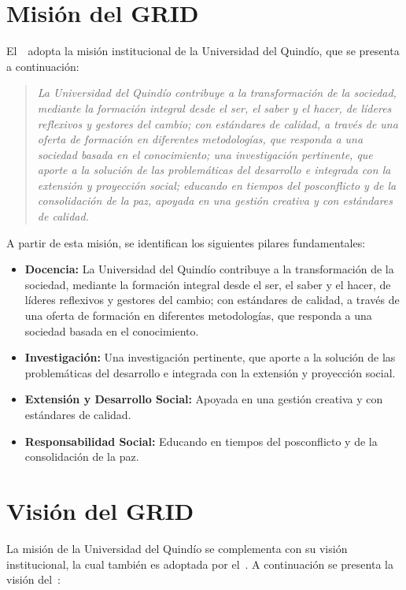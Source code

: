 \section{Misión del GRID}
El~\GRID~adopta la misión institucional de la Universidad del Quindío, que se presenta a continuación:\@

\begin{quote}
	\textit{La Universidad del Quindío contribuye a la transformación de la sociedad, mediante la formación integral desde el ser, el saber y el hacer, de líderes reflexivos y gestores del cambio; con estándares de calidad, a través de una oferta de formación en diferentes metodologías, que responda a una sociedad basada en el conocimiento; una investigación pertinente, que aporte a la solución de las problemáticas del desarrollo e integrada con la extensión y proyección social; educando en tiempos del posconflicto y de la consolidación de la paz, apoyada en una gestión creativa y con estándares de calidad.}
\end{quote}

A partir de esta misión, se identifican los siguientes pilares fundamentales:

\begin{itemize}
	\item \textbf{Docencia:} La Universidad del Quindío contribuye a la transformación de la sociedad, mediante la formación integral desde el ser, el saber y el hacer, de líderes reflexivos y gestores del cambio; con estándares de calidad, a través de una oferta de formación en diferentes metodologías, que responda a una sociedad basada en el conocimiento.

	\item \textbf{Investigación:} Una investigación pertinente, que aporte a la solución de las problemáticas del desarrollo e integrada con la extensión y proyección social.

	\item \textbf{Extensión y Desarrollo Social:} Apoyada en una gestión creativa y con estándares de calidad.

	\item \textbf{Responsabilidad Social:} Educando en tiempos del posconflicto y de la consolidación de la paz.
\end{itemize}

\section{Visión del GRID}
La misión de la Universidad del Quindío se complementa con su visión institucional, la cual también es adoptada por el~\GRID. A continuación se presenta la visión del~\GRID:\@

